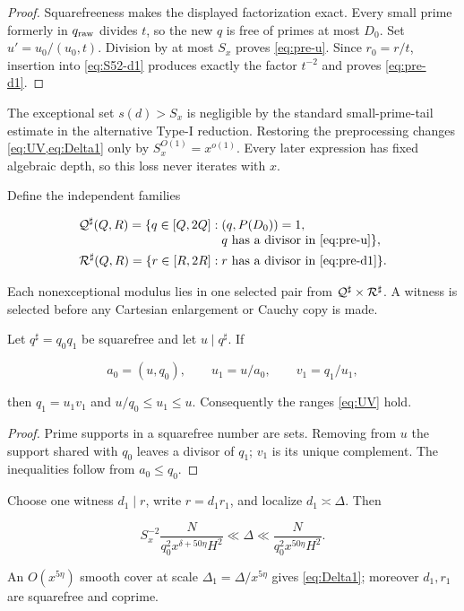 \begin{proof}
Squarefreeness makes the displayed factorization exact.  Every small prime
formerly in $q_{\rm raw}$ divides $t$, so the new $q$ is free of primes at
most $D_0$.  Set $u'=u_0/(u_0,t)$.  Division by at most $S_x$ proves
\cref{eq:pre-u}.  Since $r_0=r/t$, insertion into
\cref{eq:S52-d1} produces exactly the factor $t^{-2}$ and proves
\cref{eq:pre-d1}.
\end{proof}

The exceptional set $s(d)>S_x$ is negligible by the standard
small-prime-tail estimate in the alternative Type-I reduction.  Restoring
the preprocessing changes \cref{eq:UV,eq:Delta1} only by
$S_x^{O(1)}=x^{o(1)}$.  Every later expression has fixed algebraic depth,
so this loss never iterates with $x$.

Define the independent families

\begin{equation}\label{eq:families}
\begin{aligned}
\Qfam(Q,R)=\{q\in[Q,2Q]:{}&(q,P(D_0))=1,\\[-1mm]
&q\text{ has a divisor in \cref{eq:pre-u}}\},\\
\Rfam(Q,R)=\{r\in[R,2R]:{}&
r\text{ has a divisor in \cref{eq:pre-d1}}\}.
\end{aligned}
\end{equation}

Each nonexceptional modulus lies in one selected pair from
$\mathcal Q^{\sharp}\times\mathcal R^{\sharp}$.  A witness is selected before any Cartesian
enlargement or Cauchy copy is made.

\begin{lemma}\label{lem:first-factor}
Let $q^\sharp=q_0q_1$ be squarefree and let $u\mid q^\sharp$.  If

\[
 a_0=(u,q_0),\qquad u_1=u/a_0,\qquad v_1=q_1/u_1,
\]

then $q_1=u_1v_1$ and $u/q_0\le u_1\le u$.  Consequently the ranges
\cref{eq:UV} hold.
\end{lemma}

\begin{proof}
Prime supports in a squarefree number are sets.  Removing from $u$ the
support shared with $q_0$ leaves a divisor of $q_1$; $v_1$ is its unique
complement.  The inequalities follow from $a_0\le q_0$.
\end{proof}

\begin{lemma}\label{lem:second-factor}
Choose one witness $d_1\mid r$, write $r=d_1r_1$, and localize
$d_1\asymp\Delta$.  Then

\[
 S_x^{-2}\frac{N}{q_0^2x^{\delta+50\eta}H^2}\ll\Delta
 \ll\frac{N}{q_0^2x^{50\eta}H^2}.
\]

An $O(x^{5\eta})$ smooth cover at scale
$\Delta_1=\Delta/x^{5\eta}$ gives \cref{eq:Delta1}; moreover $d_1,r_1$
are squarefree and coprime.
\end{lemma}

